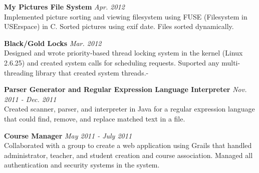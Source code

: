 \documentclass{article}
\makeatletter
\newcommand{\entry}[1]{\def \@entry {#1}}
\newcommand{\dates}[1]{\def \@dates {#1}}
\newenvironment{datedentry}{
		\vspace{0.5em} %
		{\bf \@entry} \hfill {\it \@dates} \\
	}{}
\makeatother
\begin{document}
\entry{My Pictures File System}
\dates{Apr. 2012}
\begin{datedentry}
Implemented picture sorting and viewing filesystem using FUSE (Filesystem in
USErspace) in C. Sorted pictures using exif date. Files sorted dynamically.
\end{datedentry}

\entry{Black/Gold Locks}
\dates{Mar. 2012}
\begin{datedentry}
Designed and wrote priority-based thread locking system in the kernel (Linux
2.6.25) and created system calls for scheduling requests. Suported any
multi-threading library that created system threads.-
\end{datedentry}

\entry{Parser Generator and Regular Expression Language Interpreter}
\dates{Nov. 2011 - Dec. 2011}
\begin{datedentry}
Created scanner, parser, and interpreter in Java for a regular expression
language that could find, remove, and replace matched text in a file.
\end{datedentry}

\entry{Course Manager}
\dates{May 2011 - July 2011}
\begin{datedentry}
Collaborated with a group to create a web application using Grails that handled
administrator, teacher, and student creation and course association. Managed all
authentication and security systems in the system.
\end{datedentry}
\end{document}
